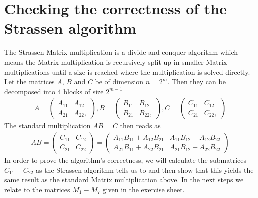 \documentclass[11pt,a4paper]{article}
\begin{document}
\section{Checking the correctness of the Strassen algorithm}
The Strassen Matrix multiplication is a divide and conquer algorithm which means the Matrix multiplication is recursively split up in smaller Matrix multiplications until a size is reached where the multiplication is solved directly.
\newline
\newline
Let the matrices $A$, $B$ and $C$ be of dimension $n=2^m$. Then they can be decomposed into 4 blocks of size $2^{m-1}$
\newline
\begin{align}
    A = \begin{pmatrix} A_{11} & A_{12} \\ A_{21} & A_{22},  \end{pmatrix}, 
    B = \begin{pmatrix} B_{11} & B_{12} \\ B_{21} & B_{22},  \end{pmatrix}, 
    C = \begin{pmatrix} C_{11} & C_{12} \\ C_{21} & C_{22},  \end{pmatrix}
\end{align}
\newline
The standard multiplication $AB=C$ then reads as
\newline
\begin{align}
    AB = 
    \begin{pmatrix} C_{11} & C_{12} \\ C_{21} & C_{22} \end{pmatrix} =
    \begin{pmatrix} A_{11}B_{11}+A_{12}B_{21} &
                         A_{11}B_{12}+A_{12}B_{22} \\
                         A_{21}B_{11}+A_{22}B_{21} &
                         A_{21}B_{12}+A_{22}B_{22} \end{pmatrix}
\end{align}
\newline
In order to prove the algorithm's correctness, we will calculate the submatrices $C_{11} - C_{22}$ as the Strassen algorithm tells us to and then show that this yields the same result as the standard Matrix multiplication above.
\newline
In the next steps we relate to the matrices $M_1 - M_7$ given in the exercise sheet.
\end{document}
